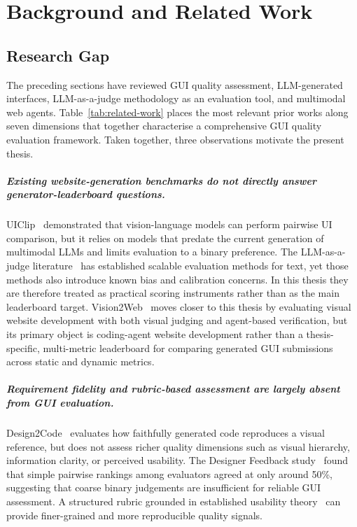 \chapter{Background and Related Work}
\label{chap:background}

\section{Research Gap}
\label{sec:gap}

The preceding sections have reviewed GUI quality assessment, LLM-generated
interfaces, LLM-as-a-judge methodology as an evaluation tool, and
multimodal web agents.
Table~\ref{tab:related-work} places the most relevant prior works along
seven dimensions that together characterise a comprehensive GUI quality
evaluation framework.
Taken together, three observations motivate the present thesis.

\paragraph{Existing website-generation benchmarks do not directly answer generator-leaderboard questions.}
UIClip~\cite{uiclip} demonstrated that vision-language models can perform
pairwise UI comparison, but it relies on models that predate the current
generation of multimodal LLMs and limits evaluation to a binary preference.
The LLM-as-a-judge literature~\cite{llm_judge,li-etal-2025-generation}
has established scalable evaluation methods for text, yet those methods
also introduce known bias and calibration concerns. In this thesis they
are therefore treated as practical scoring instruments rather than as the
main leaderboard target.
Vision2Web~\cite{vision2web} moves closer to this thesis by evaluating
visual website development with both visual judging and agent-based
verification, but its primary object is coding-agent website development
rather than a thesis-specific, multi-metric leaderboard for comparing
generated GUI submissions across static and dynamic metrics.

\paragraph{Requirement fidelity and rubric-based assessment are largely absent from GUI evaluation.}
Design2Code~\cite{design2code} evaluates how faithfully generated code
reproduces a visual reference, but does not assess richer quality dimensions
such as visual hierarchy, information clarity, or perceived usability.
The Designer Feedback study~\cite{designer_feedback} found that simple
pairwise rankings among evaluators agreed at only around 50\%, suggesting
that coarse binary judgements are insufficient for reliable GUI assessment.
A structured rubric grounded in established usability
theory~\cite{nielsen1990heuristic,iso9241-11} can provide finer-grained and
more reproducible quality signals.

